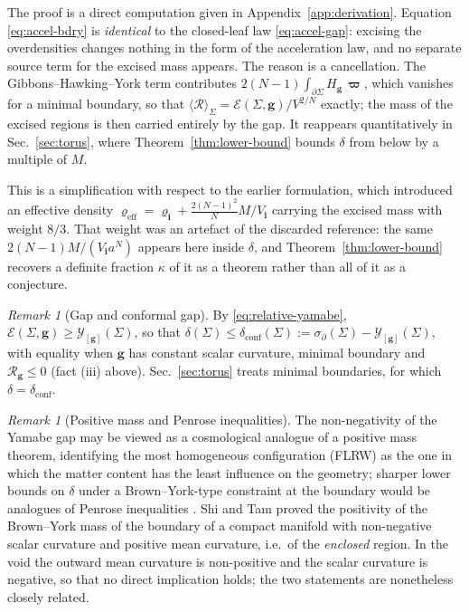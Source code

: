 \documentclass[aps,prd,reprint,amsmath,amssymb,nofootinbib,longbibliography]{revtex4-2}
\newcommand{\g}{\mathbf{g}}                 %
\newcommand{\Rs}{\mathcal{R}}               %
\newcommand{\bvol}{\boldsymbol{\varpi}}     %
\newcommand{\sigbd}{\sigma_\partial}       %
\newcommand{\ini}[1]{{#1}_{\mathbf{i}}}     %
\newcommand{\inirho}{\ini{\varrho}}
\newcommand{\EH}{\mathcal{E}}               %
\newcommand{\Y}{\mathcal{Y}}                %
\theoremstyle{plain}
\theoremstyle{definition}
\theoremstyle{remark}
\newtheorem{remark}[theorem]{Remark}
\begin{document}
The proof is a direct computation given in Appendix~\ref{app:derivation}. Equation \eqref{eq:accel-bdry} is \emph{identical} to the closed-leaf law \eqref{eq:accel-gap}: excising the overdensities changes nothing in the form of the acceleration law, and no separate source term for the excised mass appears. The reason is a cancellation. The Gibbons--Hawking--York term contributes $2(N-1)\int_{\partial\Sigma}H_\g\,\bvol$, which vanishes for a minimal boundary, so that $\langle\Rs\rangle_\Sigma=\EH(\Sigma,\g)/V^{2/N}$ exactly; the mass of the excised regions is then carried entirely by the gap. It reappears quantitatively in Sec.~\ref{sec:torus}, where Theorem~\ref{thm:lower-bound} bounds $\delta$ from below by a multiple of $M$.

This is a simplification with respect to the earlier formulation, which introduced an effective density $\varrho_{\mathrm{eff}}=\inirho+\frac{2(N-1)^2}{N}M/\ini V$ carrying the excised mass with weight $8/3$. That weight was an artefact of the discarded reference: the same $2(N-1)M/(\ini V a^N)$ appears here inside $\delta$, and Theorem~\ref{thm:lower-bound} recovers a definite fraction $\kappa$ of it as a theorem rather than all of it as a conjecture.

\begin{remark}[Gap and conformal gap]
\label{rem:conformal-gap}
By \eqref{eq:relative-yamabe}, $\EH(\Sigma,\g)\ge\Y_{[\g]}(\Sigma)$, so that $\delta(\Sigma)\le\delta_{\mathrm{conf}}(\Sigma):=\sigbd(\Sigma)-\Y_{[\g]}(\Sigma)$, with equality when $\g$ has constant scalar curvature, minimal boundary and $\Rs_\g\le0$ (fact (iii) above). Sec.~\ref{sec:torus} treats minimal boundaries, for which $\delta=\delta_{\mathrm{conf}}$.
\end{remark}

\begin{remark}[Positive mass and Penrose inequalities]
\label{rem:positive-mass}
The non-negativity of the Yamabe gap may be viewed as a cosmological analogue of a positive mass theorem, identifying the most homogeneous configuration (FLRW) as the one in which the matter content has the least influence on the geometry; sharper lower bounds on $\delta$ under a Brown--York-type constraint at the boundary would be analogues of Penrose inequalities \cite{penrose1969gravitational,MR1916951}. Shi and Tam \cite{MR1987378} proved the positivity of the Brown--York mass of the boundary of a compact manifold with non-negative scalar curvature and positive mean curvature, i.e.\ of the \emph{enclosed} region. In the void the outward mean curvature is non-positive and the scalar curvature is negative, so that no direct implication holds; the two statements are nonetheless closely related.
\end{remark}
\end{document}
